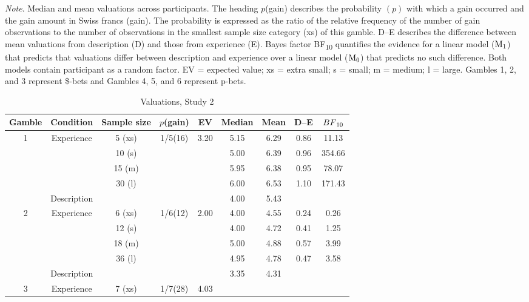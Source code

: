 \documentclass[a4paper, man, natbib, floatsintext]{apa6} %
\begin{document}
\begin{ThreePartTable}
\begin{TableNotes}
\small
\item \textit{Note}. Median and mean valuations across participants. The heading $p$(gain) describes the probability $(p)$ with which a gain occurred and the gain amount in Swiss francs (gain). The probability is expressed as the ratio of the relative frequency of the number of gain observations to the number of observations in the smallest sample size category (xs) of this gamble. D--E describes the difference between mean valuations from description (D) and those from experience (E). Bayes factor BF\textsubscript{10} quantifies the evidence for a linear model ($\mathrm{M}\textsubscript{1}$) that predicts that valuations differ between description and experience over a linear model ($\mathrm{M}\textsubscript{0}$) that predicts no such difference. Both models contain participant as a random factor. EV = expected value; xs = extra small; s = small; m = medium; l = large. Gambles 1, 2, and 3 represent \$-bets and Gambles 4, 5, and 6 represent p-bets.
\end{TableNotes}
\footnotesize
\begin{longtable}{ccccccccc}
\caption{Valuations, Study 2}\label{table:meansStudy3}\\
\toprule
Gamble & Condition & Sample size & \(p\)(gain) &  EV& Median & Mean& D--E& $BF\textsubscript{10}$\\
\hline
\multirow{5}{*}{1} &\multirow{4}{*}{Experience} & 5 (xs)  & \multirow{5}{*}{1/5(16)}& \multirow{5}{*}{3.20}
 & 5.15 & 6.29 & 0.86&11.13\\
&& 10 (s) &&& 5.00 & 6.39 & 0.96& 354.66\\
&& 15 (m)&&&5.95 & 6.38 & 0.95&78.07\\
&& 30 (l)&&& 6.00 & 6.53 & 1.10&171.43\\
& Description &&&&  4.00 & 5.43 && \\
\hline
\multirow{5}{*}{2} &\multirow{4}{*}{Experience} & 6 (xs)  & \multirow{5}{*}{1/6(12)}& \multirow{5}{*}{2.00}
& 4.00 & 4.55 & 0.24&0.26 \\
&& 12 (s) &&&   4.00 & 4.72 & 0.41&1.25 \\
&& 18 (m) &&&   5.00 & 4.88 & 0.57 &3.99\\
&& 36 (l) &&&   4.95 & 4.78 & 0.47 &3.58\\
& Description &&&&   3.35 & 4.31 && \\
\hline
\multirow{5}{*}{3} &\multirow{4}{*}{Experience} & 7 (xs)  & \multirow{5}{*}{1/7(28)}&  \multirow{5}{*}{4.03}

\end{longtable}
\end{ThreePartTable}
\end{document}
